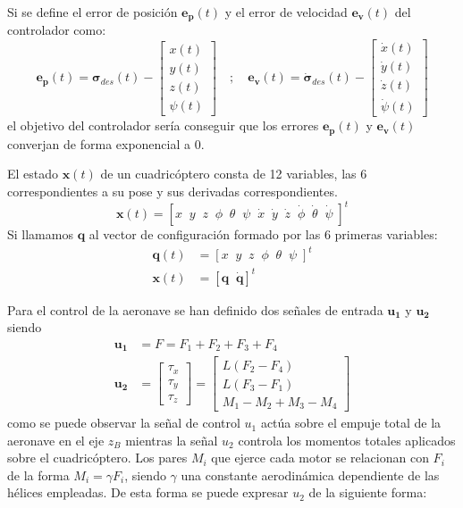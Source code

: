 Si se define el error de posición $\mathbf{e_p}(t)$ y el error de velocidad $\mathbf{e_v}(t)$ del controlador como:
\begin{equation}
	\mathbf{e_p}(t) = \mathbf{\sigma}_{des}(t) -\begin{bmatrix}
		x(t)\\
		y(t)\\
		z(t)\\
		\psi(t)
	\end{bmatrix} \quad;\quad 
\mathbf{e_v}(t) = \mathbf{\dot \sigma}_{des}(t) -\begin{bmatrix}
	\dot x(t)\\
	\dot y(t)\\
	\dot z(t)\\
	\dot \psi(t)
\end{bmatrix}
\end{equation}
el objetivo del controlador sería conseguir que los errores $\mathbf{e_p}(t)$ y $\mathbf{e_v}(t)$ converjan de forma exponencial a 0.


El estado $\mathbf{x}(t)$ de un cuadricóptero consta de 12 variables, las 6 correspondientes a su pose y sus derivadas correspondientes.
\begin{equation}
\mathbf{x}(t) = \left[
	x  \;\;
	y  \;\;
	z  \;\;
	\phi  \;\;
	\theta  \;\;
	\psi  \;\;
	\dot{x}  \;\;
	\dot{y}  \;\;
	\dot{z}  \;\;
	\dot{\phi}  \;\;
	\dot{\theta}  \;\;
	\dot{\psi}\;\right]^t
\end{equation}
Si llamamos $\mathbf{q}$ al vector de configuración formado por las 6 primeras variables:
\begin{align}
	\mathbf{q}(t) &= \left[
	x  \;\;
	y  \;\;
	z  \;\;
	\phi  \;\;
	\theta  \;\;
	\psi  \;\right]^t\\
	\mathbf{x}(t) &= \left[\mathbf{q} \;\; \mathbf{\dot{q}}\right]^t
\end{align}

Para el control de la aeronave se han definido dos señales de entrada $\mathbf{u_1}$ y $\mathbf{u_2}$ siendo 
\begin{align}
	\mathbf{u_1}  &= F =  F_1 +F_2 +F_3 +F_4  \label{eq:u1}\\
	\mathbf{u_2}  &= \begin{bmatrix} \tau_x\\ 
		\tau_y\\
		\tau_z
	\end{bmatrix} =\begin{bmatrix}
	L (F_2-F_4)\\
	L (F_3-F_1)\\
	M_1 - M_2 + M_3 - M_4
\end{bmatrix}
\end{align} 
como se puede observar la señal de control $u_1$ actúa sobre el empuje total de la aeronave en el eje $z_B$ mientras la señal $u_2$ controla los momentos totales aplicados sobre el cuadricóptero. Los pares $M_i$ que ejerce cada motor se relacionan con $F_i$ de la forma $M_i = \gamma F_i$, siendo $\gamma$ una constante aerodinámica dependiente de las hélices empleadas. De esta forma se puede expresar $u_2$ de la siguiente forma:


